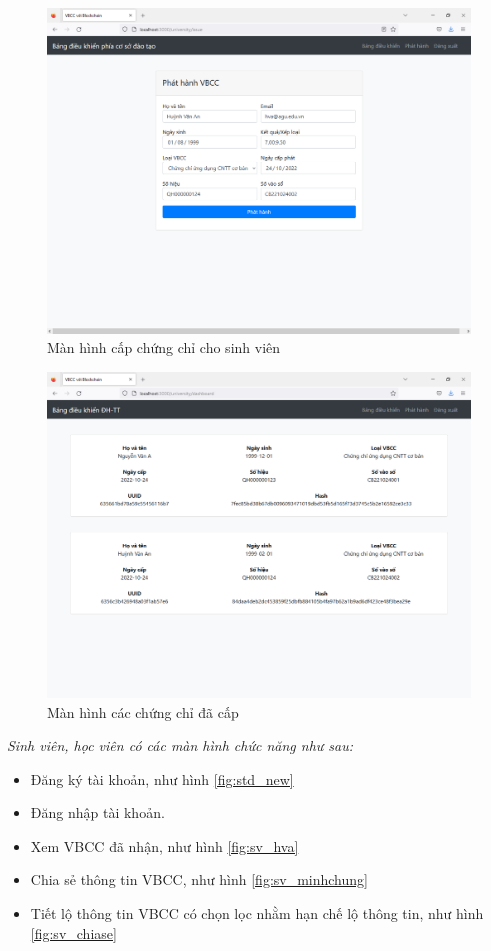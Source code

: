 \begin{figure}[htbp]
\centering
\includegraphics[width=.9\linewidth]{img/tt_phathanh.PNG}
\caption{Màn hình cấp chứng chỉ cho sinh viên}
\label{fig:tt_phathanh}
\end{figure}

\begin{figure}[htbp]
\centering
\includegraphics[width=.9\linewidth]{img/tt_dacap.PNG}
\caption{Màn hình các chứng chỉ đã cấp}
\label{fig:tt_dacap}
\end{figure}


\emph{Sinh viên, học viên có các màn hình chức năng như sau:}

\begin{itemize}
\item Đăng ký tài khoản, như hình \ref{fig:std_new}
\item Đăng nhập tài khoản.
\item Xem VBCC đã nhận, như hình \ref{fig:sv_hva}
\item Chia sẻ thông tin VBCC, như hình \ref{fig:sv_minhchung}
\item Tiết lộ thông tin VBCC có chọn lọc nhằm hạn chế lộ thông tin, như hình \ref{fig:sv_chiase}
\end{itemize}

